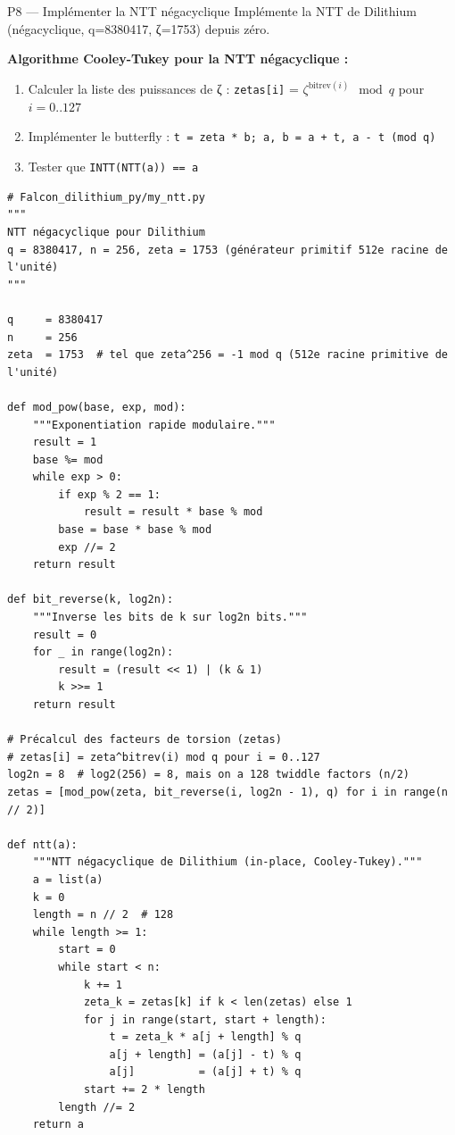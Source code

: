 \documentclass[12pt, a4paper]{article}
\begin{document}
\begin{exercice}{P8 --- Implémenter la NTT négacyclique}
Implémente la NTT de Dilithium (négacyclique, q=8380417, ζ=1753) depuis zéro.

\textbf{Algorithme Cooley-Tukey pour la NTT négacyclique :}
\begin{enumerate}
  \item Calculer la liste des puissances de ζ : \texttt{zetas[i]} = $\zeta^{\text{bitrev}(i)} \mod q$ pour $i = 0..127$
  \item Implémenter le butterfly : \texttt{t = zeta * b; a, b = a + t, a - t (mod q)}
  \item Tester que \texttt{INTT(NTT(a)) == a}
\end{enumerate}
\end{exercice}

\begin{solution}
\begin{lstlisting}[style=python]
# Falcon_dilithium_py/my_ntt.py
"""
NTT négacyclique pour Dilithium
q = 8380417, n = 256, zeta = 1753 (générateur primitif 512e racine de l'unité)
"""

q     = 8380417
n     = 256
zeta  = 1753  # tel que zeta^256 = -1 mod q (512e racine primitive de l'unité)

def mod_pow(base, exp, mod):
    """Exponentiation rapide modulaire."""
    result = 1
    base %= mod
    while exp > 0:
        if exp % 2 == 1:
            result = result * base % mod
        base = base * base % mod
        exp //= 2
    return result

def bit_reverse(k, log2n):
    """Inverse les bits de k sur log2n bits."""
    result = 0
    for _ in range(log2n):
        result = (result << 1) | (k & 1)
        k >>= 1
    return result

# Précalcul des facteurs de torsion (zetas)
# zetas[i] = zeta^bitrev(i) mod q pour i = 0..127
log2n = 8  # log2(256) = 8, mais on a 128 twiddle factors (n/2)
zetas = [mod_pow(zeta, bit_reverse(i, log2n - 1), q) for i in range(n // 2)]

def ntt(a):
    """NTT négacyclique de Dilithium (in-place, Cooley-Tukey)."""
    a = list(a)
    k = 0
    length = n // 2  # 128
    while length >= 1:
        start = 0
        while start < n:
            k += 1
            zeta_k = zetas[k] if k < len(zetas) else 1
            for j in range(start, start + length):
                t = zeta_k * a[j + length] % q
                a[j + length] = (a[j] - t) % q
                a[j]          = (a[j] + t) % q
            start += 2 * length
        length //= 2
    return a


\end{lstlisting}
\end{solution}
\end{document}
